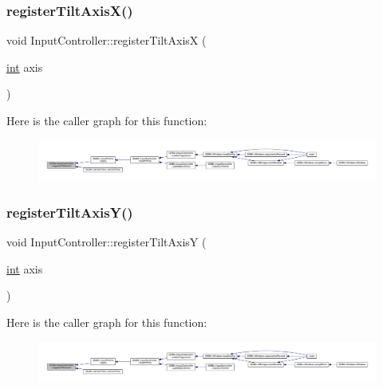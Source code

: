 \subsubsection{\texorpdfstring{register\+Tilt\+Axis\+X()}{registerTiltAxisX()}}
{\footnotesize\ttfamily void Input\+Controller\+::register\+Tilt\+AxisX (\begin{DoxyParamCaption}\item[{\mbox{\hyperlink{ioapi_8h_a787fa3cf048117ba7123753c1e74fcd6}{int}}}]{axis }\end{DoxyParamCaption})}

Here is the caller graph for this function\+:
\nopagebreak
\begin{figure}[H]
\begin{center}
\leavevmode
\includegraphics[width=350pt]{class_q_g_b_a_1_1_input_controller_a0938dad12d333efcc9c3e310c0abbea2_icgraph}
\end{center}
\end{figure}
\mbox{\label{class_q_g_b_a_1_1_input_controller_a25e2e4bde89acb77fcf662794f92d12d}} 
\subsubsection{\texorpdfstring{register\+Tilt\+Axis\+Y()}{registerTiltAxisY()}}
{\footnotesize\ttfamily void Input\+Controller\+::register\+Tilt\+AxisY (\begin{DoxyParamCaption}\item[{\mbox{\hyperlink{ioapi_8h_a787fa3cf048117ba7123753c1e74fcd6}{int}}}]{axis }\end{DoxyParamCaption})}

Here is the caller graph for this function\+:
\nopagebreak
\begin{figure}[H]
\begin{center}
\leavevmode
\includegraphics[width=350pt]{class_q_g_b_a_1_1_input_controller_a25e2e4bde89acb77fcf662794f92d12d_icgraph}
\end{center}
\end{figure}
\mbox{\label{class_q_g_b_a_1_1_input_controller_a45623e9ffa5626156b6f581de78f082f}} 
